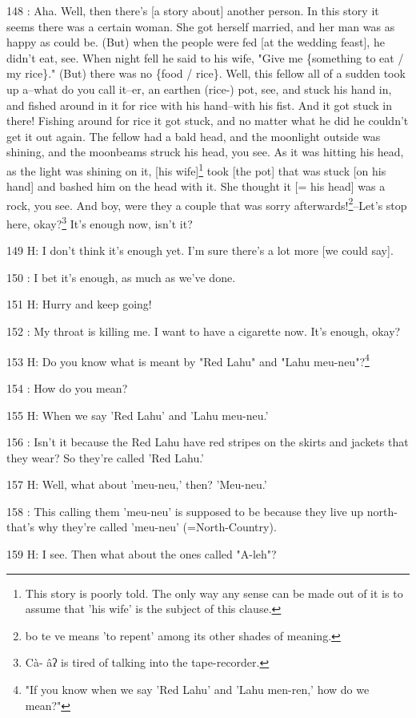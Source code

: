 148  : Aha. Well, then there's [a story about] another person. In this story it
seems there was a certain woman. She got herself married, and her man was as happy
as could be. (But) when the people were fed [at the wedding feast], he didn't eat,
see. When night fell he said to his wife, "Give me \{something to eat
/ my rice\}." (But) there was no \{food / rice\}. Well, this fellow all
of a sudden took up a--what do you call it--er, an earthen (rice-) pot, see, and
stuck his hand in, and fished around in it for rice with his hand--with his fist.
And it got stuck in there! Fishing around for rice it got stuck, and no matter
what he did he couldn't get it out again. The fellow had a bald head, and the moonlight
outside was shining, and the moonbeams struck his head, you see. As it was hitting
his head, as the light was shining on it, [his wife]\footnote{This story is poorly told. The only way any sense can be made out of it is to assume that 'his wife' is the subject of this clause.} took [the pot] that was
stuck [on his hand] and bashed him on the head with it. She thought it [= his head]
was a rock, you see. And boy, were they a couple that was sorry afterwards!\footnote{bo te ve means 'to repent' among its other shades of meaning.}--Let's
stop here, okay?\footnote{Cà- âʔ is tired of talking into the tape-recorder.} It's enough now, isn't it?

149 H: I don't think it's enough yet. I'm sure there's a lot more [we could say].

150  : I bet it's enough, as much as we've done.

151 H: Hurry and keep going!

152  : My throat is killing me. I want to have a cigarette now. It's enough, okay?

153 H: Do you know what is meant by "Red Lahu" and "Lahu
meu-neu"?\footnote{"If you know when we say 'Red Lahu' and 'Lahu men-ren,' how do we mean?"}

154  : How do you mean?

155 H: When we say 'Red Lahu' and 'Lahu meu-neu.'

156  : Isn't it because the Red Lahu have red stripes on the skirts and jackets
that they wear? So they're called 'Red Lahu.'

157 H: Well, what about 'meu-neu,' then? 'Meu-neu.'

158  : This calling them 'meu-neu' is supposed to be because they live up north-that's
why they're called 'meu-neu' (=North-Country).

159 H: I see. Then what about the ones called "A-leh"?

